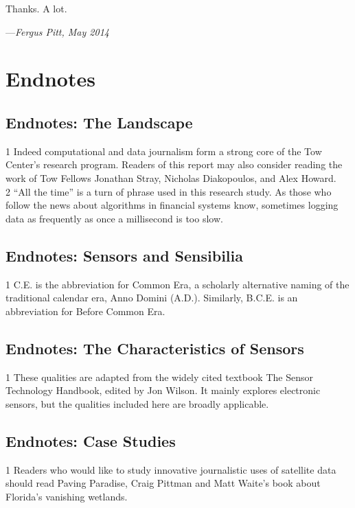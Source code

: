 \begin{itemize}
\begin{itemized}
\begin{itemize}
Thanks. A lot.

—\textit{Fergus Pitt, May 2014}




\chapter{Endnotes}


\section{Endnotes: The Landscape}
1 Indeed computational and data journalism form a strong core of the Tow Center's research program. Readers of this report may also consider reading the work of Tow Fellows Jonathan Stray, Nicholas Diakopoulos, and Alex Howard.\\
2 ``All the time'' is a turn of phrase used in this research study. As those who follow the news about algorithms in financial systems know, sometimes logging data as frequently as once a millisecond
is too slow.\\

\section{Endnotes: Sensors and Sensibilia}
1 C.E. is the abbreviation for Common Era, a scholarly alternative naming of the traditional calendar era, Anno Domini (A.D.). Similarly, B.C.E. is an abbreviation for Before Common Era.\\

\section{Endnotes: The Characteristics of Sensors}
1 These qualities are adapted from the widely cited textbook The Sensor Technology Handbook,
edited by Jon Wilson. It mainly explores electronic sensors, but the qualities included here are
broadly applicable.\\

\section{Endnotes: Case Studies}
1 Readers who would like to study innovative journalistic uses of satellite data should read Paving Paradise, Craig Pittman and Matt Waite's book about Florida's vanishing wetlands.\\


\end{itemize}
\end{itemized}
\end{itemize}
